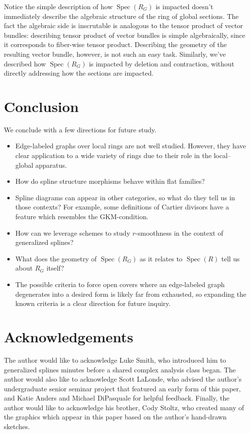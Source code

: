 \documentclass{article}
\DeclareMathOperator{\Spec}{Spec}
\begin{document}
Notice the simple description of how $\Spec(R_{G})$ is impacted doesn't immediately describe the algebraic structure of the ring of global sections. The fact the algebraic side is inscrutable is analogous to the tensor product of vector bundles: describing tensor product of vector bundles is simple algebraically, since it corresponds to fiber-wise tensor product. Describing the geometry of the resulting vector bundle, however, is not such an easy task. Similarly, we've described how $\Spec(R_{G})$ is impacted by deletion and contraction, without directly addressing how the sections are impacted.

\section{Conclusion}
We conclude with a few directions for future study. 
\begin{itemize}
\item Edge-labeled graphs over local rings are not well studied. However, they have clear application to a wide variety of rings due to their role in the local--global apparatus. 
\item How do spline structure morphisms behave within flat families?
\item Spline diagrams can appear in other categories, so what do they tell us in those contexts? For example, some definitions of Cartier divisors have a feature which resembles the GKM-condition.
\item How can we leverage schemes to study $r$-smoothness in the context of generalized splines? 
\item What does the geometry of $\Spec(R_{G})$ as it relates to $\Spec(R)$ tell us about $R_{G}$ itself?
\item The possible criteria to force open covers where an edge-labeled graph degenerates into a desired form is likely far from exhausted, so expanding the known criteria is a clear direction for future inquiry. 
\end{itemize}

\section{Acknowledgements}
The author would like to acknowledge Luke Smith, who introduced him to generalized splines minutes before a shared complex analysis class began. The author would also like to acknowledge Scott LaLonde, who advised the author's undergraduate senior seminar project that featured an early form of this paper, and Katie Anders and Michael DiPasquale for helpful feedback. Finally, the author would like to acknowledge his brother, Cody Stoltz, who created many of the graphics which appear in this paper based on the author's hand-drawn sketches.
\end{document}
